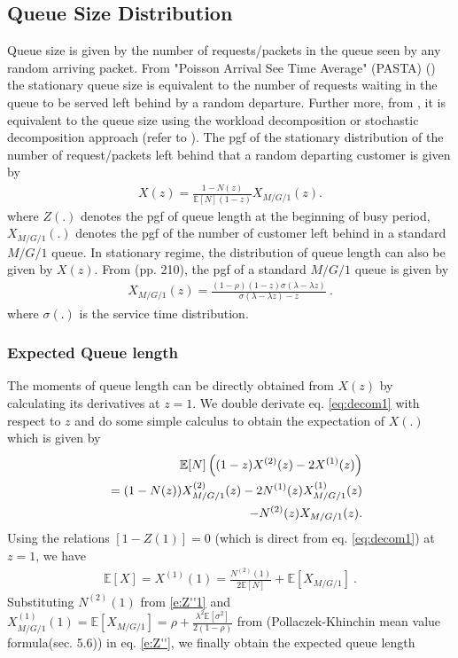 \documentclass[journal]{IEEEtran}
\newcommand {\bear} {\begin{eqnarray}}
\newcommand {\eear} {\end{eqnarray}}
\def \E{{\mathbb E}}
\begin{document}
\subsection{Queue Size Distribution}
Queue size is given by the number of requests/packets in the queue seen by any random arriving packet. From "Poisson Arrival See Time Average" (PASTA) (\cite{Pasta_1982}) the stationary queue size is equivalent to the number of requests waiting in the queue to be served left behind by a random departure. Further more, from \cite{Kleinrock}, it is equivalent to the queue size using the workload decomposition or stochastic decomposition approach (refer to \cite{Fuhrmann_Copper_1985}). The pgf of the stationary distribution of the number of request/packets left behind that a random departing customer is given by
\bear
\label{eq:decom1}
X(z)=\frac{1- N(z)}{\E[N](1-z)} X_{M/G/1}(z).
\eear
\noindent
where $Z(.)$ denotes the pgf of queue length at
the beginning of busy period, $X_{M/G/1}(.)$ denotes the pgf of the number of customer left behind in a standard $M/G/1$ queue. In stationary regime, the distribution of queue length can also be
given by $X(z)$. From \cite{Cooper_book}(pp. 210), the pgf of a standard $M/G/1$ queue is given by
\bear
\label{e:Xz}
X_{M/G/1}(z)=\frac{(1-\rho)(1-z)\sigma(\lambda-\lambda z)}{\sigma(\lambda-\lambda z)-z}~.
\eear
where $\sigma(.)$ is the service time distribution.\subsubsection{Expected Queue length}
The moments of queue length can be directly obtained from $X(z)$ by calculating its derivatives at $z=1$.
We double derivate eq. \eqref{eq:decom1} with respect to $z$ and do some simple calculus to obtain
the expectation of $X(.)$ which is given by 
\bear
&&\nonumber\E[N]\left((1-z)X^{(2)}(z)-2X^{(1)}(z)\right)\\
&&\nonumber =(1-N(z))X^{(2)}_{M/G/1}(z)-2N^{(1)}(z)X^{(1)}_{M/G/1}(z)\\
\label{e:Z''}&&\hspace{10mm}-N^{(2)}(z)X_{M/G/1}(z).
\eear
Using the relations
$[1-Z(1)]=0$ (which is direct from eq. \eqref{eq:decom1}) at $z=1$,
we have
\bear
\E[X]=X^{(1)}(1)=\frac{N^{(2)}(1)}{2\E[N]}+\E[X_{M/G/1}]~.
\eear
Substituting
$N^{(2)}(1)$ from \eqref{e:Z''1} and
$X^{(1)}_{M/G/1}(1)=\E[X_{M/G/1}]= \rho+\frac{\lambda^2\E[\sigma^2]}{2(1-\rho)}$
from \cite{Kleinrock} (Pollaczek-Khinchin mean value formula(sec.
5.6)) in eq. \eqref{e:Z''},
we finally obtain the expected queue length
\end{document}
